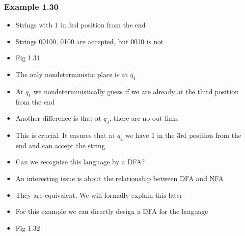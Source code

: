 \begin{frame}[allowframebreaks] \frametitle{Example 1.30}
  \begin{itemize}

\item Strings with 1 in 3rd position from the end

\item Strings 00100, 0100 are accepted, but 0010 is not


\item Fig 1.31

\begin{center}
    \end{center}
  \item The only nondeterministic place is at $q_1$
  \item At $q_1$ we nondeterministically guess if we are already
    at the third position from the end
  \item Another difference is that at $q_4$, there are no out-links
  \item [] This is crucial. It ensures that at $q_4$ we have
    1 in the 3rd position from the end and can accept the string
  \item Can we recognize this language by a DFA?
    
\item An interesting issue is about the relationship between DFA and NFA

\item They are equivalent. We will formally explain this later

\item For this example we can directly design a DFA
  for the language
\item Fig 1.32
\end{itemize}
\end{frame}
